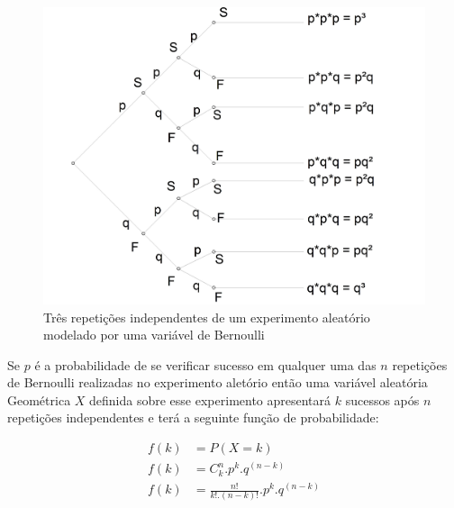 \documentclass[
]{book}
\begin{document}
\begin{figure}

{\centering \includegraphics[width=0.6\linewidth]{images6/arv_bin} 

}

\caption{Três repetições independentes de um experimento aleatório modelado por uma variável de Bernoulli}\label{fig:fig14}
\end{figure}

\hfill\break

\begin{table}[!htb]
    \caption*{Função discreta de probabilidade da variável $X\sim b(n,p)$ com $n=3$ (repetições)}
\end{table}

Se \(p\) é a probabilidade de se verificar sucesso em qualquer uma das \(n\) repetições de Bernoulli realizadas no experimento aletório então uma variável aleatória Geométrica \(X\) definida sobre esse experimento apresentará \(k\) sucessos após \(n\) repetições independentes e terá a seguinte função de probabilidade:

\hfill\break

\begin{align*}
f(k) & = P(X=k)  \\
f(k) & = {C}_{k}^{n}. {p}^{k}. {q}^{(n-k)} \\
f(k) & = \frac{n!}{k!. (n-k)!} . {p}^{k}. {q}^{(n-k)}   
\end{align*}
\end{document}
